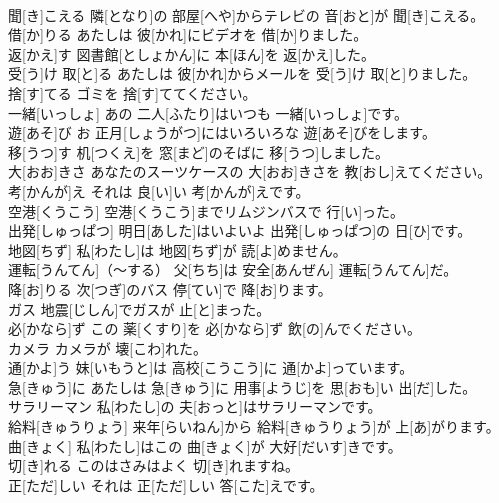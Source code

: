 \documentclass[8pt]{extreport}
\begin{document}
\begin{CJK}{UTF8}{min}
\\	聞[き]こえる	隣[となり]の 部屋[へや]からテレビの 音[おと]が 聞[き]こえる。		
\\	借[か]りる	あたしは 彼[かれ]にビデオを 借[か]りました。		
\\	返[かえ]す	図書館[としょかん]に 本[ほん]を 返[かえ]した。		
\\	受[う]け 取[と]る	あたしは 彼[かれ]からメールを 受[う]け 取[と]りました。		
\\	捨[す]てる	ゴミを 捨[す]ててください。		
\\	一緒[いっしょ]	あの 二人[ふたり]はいつも 一緒[いっしょ]です。		
\\	遊[あそ]び	お 正月[しょうがつ]にはいろいろな 遊[あそ]びをします。		
\\	移[うつ]す	机[つくえ]を 窓[まど]のそばに 移[うつ]しました。		
\\	大[おお]きさ	あなたのスーツケースの 大[おお]きさを 教[おし]えてください。		
\\	考[かんが]え	それは 良[い]い 考[かんが]えです。		
\\	空港[くうこう]	空港[くうこう]までリムジンバスで 行[い]った。		
\\	出発[しゅっぱつ]	明日[あした]はいよいよ 出発[しゅっぱつ]の 日[ひ]です。		
\\	地図[ちず]	私[わたし]は 地図[ちず]が 読[よ]めません。		
\\	運転[うんてん]（～する）	父[ちち]は 安全[あんぜん] 運転[うんてん]だ。		
\\	降[お]りる	次[つぎ]のバス 停[てい]で 降[お]ります。		
\\	ガス	地震[じしん]でガスが 止[と]まった。		
\\	必[かなら]ず	この 薬[くすり]を 必[かなら]ず 飲[の]んでください。		
\\	カメラ	カメラが 壊[こわ]れた。		
\\	通[かよ]う	妹[いもうと]は 高校[こうこう]に 通[かよ]っています。		
\\	急[きゅう]に	あたしは 急[きゅう]に 用事[ようじ]を 思[おも]い 出[だ]した。		
\\	サラリーマン	私[わたし]の 夫[おっと]はサラリーマンです。		
\\	給料[きゅうりょう]	来年[らいねん]から 給料[きゅうりょう]が 上[あ]がります。		
\\	曲[きょく]	私[わたし]はこの 曲[きょく]が 大好[だいす]きです。		
\\	切[き]れる	このはさみはよく 切[き]れますね。		
\\	正[ただ]しい	それは 正[ただ]しい 答[こた]えです。		

\end{CJK}
\end{document}
